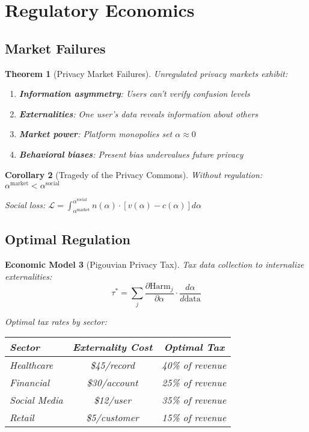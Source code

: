 \documentclass[11pt,final]{article}
\newtheorem{theorem}{Theorem}[section]
\newtheorem{corollary}[theorem]{Corollary}
\newtheorem{model}[theorem]{Economic Model}
\begin{document}
\section{Regulatory Economics}

\subsection{Market Failures}

\begin{theorem}[Privacy Market Failures]
Unregulated privacy markets exhibit:
\begin{enumerate}
    \item \textbf{Information asymmetry}: Users can't verify confusion levels
    \item \textbf{Externalities}: One user's data reveals information about others
    \item \textbf{Market power}: Platform monopolies set $\alpha \approx 0$
    \item \textbf{Behavioral biases}: Present bias undervalues future privacy
\end{enumerate}
\end{theorem}

\begin{corollary}[Tragedy of the Privacy Commons]
Without regulation: $\alpha^{\text{market}} < \alpha^{\text{social}}$

Social loss: $\mathcal{L} = \int_{\alpha^{\text{market}}}^{\alpha^{\text{social}}} n(\alpha) \cdot [v(\alpha) - c(\alpha)] d\alpha$
\end{corollary}

\subsection{Optimal Regulation}

\begin{model}[Pigouvian Privacy Tax]
Tax data collection to internalize externalities:
\begin{equation}
\tau^* = \sum_j \frac{\partial \text{Harm}_j}{\partial \alpha} \cdot \frac{d\alpha}{d\text{data}}
\end{equation}

Optimal tax rates by sector:
\begin{center}
\begin{tabular}{lcc}
\toprule
\textbf{Sector} & \textbf{Externality Cost} & \textbf{Optimal Tax} \\
\midrule
Healthcare & \$45/record & 40\% of revenue \\
Financial & \$30/account & 25\% of revenue \\
Social Media & \$12/user & 35\% of revenue \\
Retail & \$5/customer & 15\% of revenue \\
\bottomrule
\end{tabular}
\end{center}
\end{model}
\end{document}

